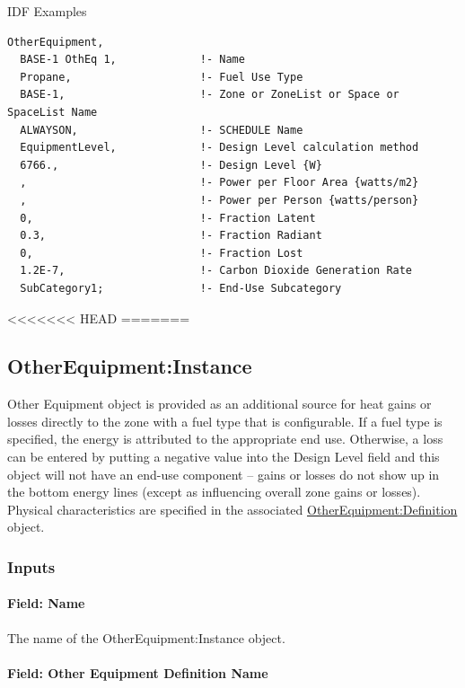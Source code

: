 IDF Examples

\begin{lstlisting}
OtherEquipment,
  BASE-1 OthEq 1,             !- Name
  Propane,                    !- Fuel Use Type
  BASE-1,                     !- Zone or ZoneList or Space or SpaceList Name
  ALWAYSON,                   !- SCHEDULE Name
  EquipmentLevel,             !- Design Level calculation method
  6766.,                      !- Design Level {W}
  ,                           !- Power per Floor Area {watts/m2}
  ,                           !- Power per Person {watts/person}
  0,                          !- Fraction Latent
  0.3,                        !- Fraction Radiant
  0,                          !- Fraction Lost
  1.2E-7,                     !- Carbon Dioxide Generation Rate
  SubCategory1;               !- End-Use Subcategory
\end{lstlisting}

<<<<<<< HEAD
=======

\subsection{OtherEquipment:Instance}\label{otherequipmentinstance}

Other Equipment object is provided as an additional source for heat gains or losses directly to the zone with a fuel type that is configurable. If a fuel type is specified, the energy is attributed to the appropriate end use. Otherwise, a loss can be entered by putting a negative value into the Design Level field and this object will not have an end-use component -- gains or losses do not show up in the bottom energy lines (except as influencing overall zone gains or losses). Physical characteristics are specified in the associated \hyperref[otherequipmentdefinition]{OtherEquipment:Definition} object.

\subsubsection{Inputs}\label{inputs-8-010-other-instance}

\paragraph{Field: Name}\label{field-name-8-008-other-instance}

The name of the OtherEquipment:Instance object.

\paragraph{Field: Other Equipment Definition Name}\label{field-other-equipment-definition-name}

